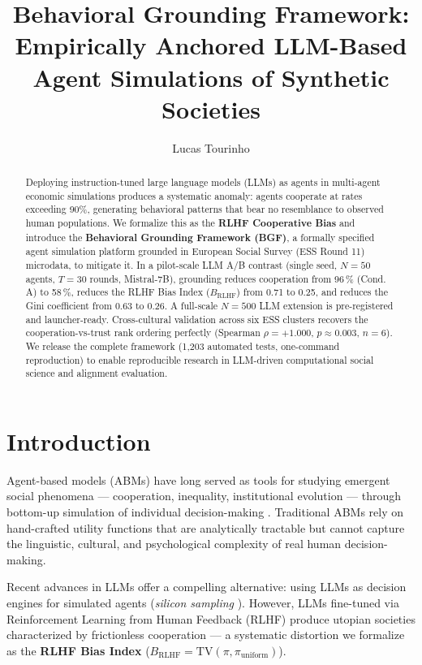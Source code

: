 \documentclass[sigconf,review]{acmart}
\title{Behavioral Grounding Framework: Empirically Anchored LLM-Based
       Agent Simulations of Synthetic Societies}
\author{Lucas Tourinho}
\affiliation{%
  \institution{TODO: institution}
  \city{TODO: city}
  \country{TODO: country}
}
\begin{document}
\begin{abstract}
Deploying instruction-tuned large language models (LLMs) as agents in
multi-agent economic simulations produces a systematic anomaly: agents
cooperate at rates exceeding 90\%, generating behavioral patterns that
bear no resemblance to observed human populations.  We formalize this
as the \textbf{RLHF Cooperative Bias} and introduce the
\textbf{Behavioral Grounding Framework (BGF)}, a formally specified
agent simulation platform grounded in European Social Survey (ESS Round
11) microdata, to mitigate it.  In a pilot-scale LLM A/B contrast
(single seed, $N{=}50$ agents, $T{=}30$ rounds, Mistral-7B), grounding
reduces cooperation from 96\,\% (Cond.\,A) to 58\,\%, reduces the RLHF
Bias Index ($B_\text{RLHF}$) from 0.71 to 0.25, and reduces the Gini
coefficient from 0.63 to 0.26.  A full-scale $N{=}500$ LLM extension is
pre-registered and launcher-ready.  Cross-cultural validation across six
ESS clusters recovers the cooperation-vs-trust rank ordering perfectly
(Spearman $\rho = +1.000$, $p \approx 0.003$, $n{=}6$).  We release
the complete framework (1,203 automated tests, one-command reproduction)
to enable reproducible research in LLM-driven computational social
science and alignment evaluation.
\end{abstract}


\maketitle

\section{Introduction}

Agent-based models (ABMs) have long served as tools for studying
emergent social phenomena --- cooperation, inequality, institutional
evolution --- through bottom-up simulation of individual decision-making
\cite{epstein1996,axelrod1984}.  Traditional ABMs rely on hand-crafted
utility functions that are analytically tractable but cannot capture
the linguistic, cultural, and psychological complexity of real human
decision-making.

Recent advances in LLMs offer a compelling alternative: using LLMs as
decision engines for simulated agents (\emph{silicon sampling}
\cite{argyle2023}).  However, LLMs fine-tuned via Reinforcement
Learning from Human Feedback (RLHF) \cite{ouyang2022} produce utopian
societies characterized by frictionless cooperation --- a systematic
distortion we formalize as the \textbf{RLHF Bias Index}
($B_\text{RLHF} = \mathrm{TV}(\pi, \pi_\text{uniform})$).
\end{document}
